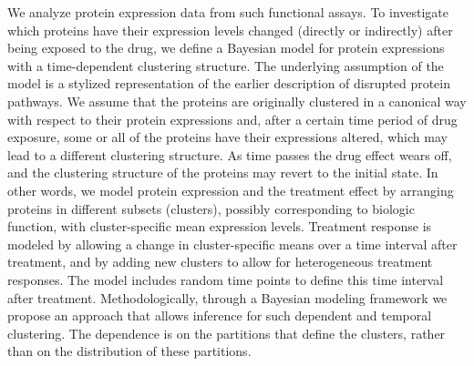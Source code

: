 We analyze protein expression data from such functional
assays. To investigate which proteins have their expression levels changed
(directly or indirectly) after being exposed to the drug, we define a
Bayesian model for protein expressions with a time-dependent clustering
structure. The underlying assumption of the model is a stylized
representation of the earlier description of disrupted protein pathways.
We assume that the proteins are originally clustered in a canonical way
with respect to their protein expressions and, after a certain time period
of drug exposure, some or all of the proteins have their expressions
altered, which may lead to a different clustering structure. As time
passes the drug effect wears off, and the clustering structure of the
proteins may revert to the initial state. In other words, we model
protein expression and the treatment 
effect by arranging proteins in different subsets (clusters), possibly
corresponding to biologic function, with cluster-specific mean
expression levels. Treatment response is modeled by allowing a change
in cluster-specific means over a time interval after treatment, and by
adding new clusters to allow for heterogeneous treatment responses.
The model includes random time points to define this time
interval after treatment. Methodologically, through a Bayesian modeling framework we propose
an approach that allows inference for such dependent and temporal
clustering. The dependence is on the partitions that define the
clusters, rather than on the distribution of these partitions.


